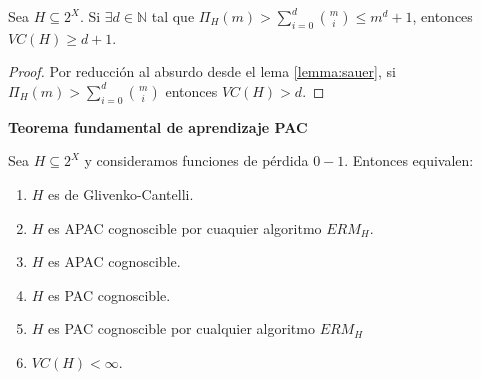 \begin{corollary}
Sea $H \subseteq 2^X$. Si $\exists d\in \mathbb{N}$ tal que $\Pi_{H} (m) > \sum_{i=0}^d \binom{m}{i} \le m^d + 1$,
entonces $VC(H) \ge d+1$.
\end{corollary}

\begin{proof}
Por reducción al absurdo desde el lema \ref{lemma:sauer}, si $\Pi_{H}(m) > \sum_{i=0}^d \binom{m}{i}$ entonces $VC(H) > d$.
\end{proof}

\begin{theorem}
 
\end{theorem}



\begin{theorem}
\textbf{Teorema fundamental de aprendizaje PAC}

Sea $H\subseteq 2^X$ y consideramos funciones de pérdida $0-1$. Entonces equivalen:

\begin{enumerate}[i]
\item \label{th:fundi} $H$ es de Glivenko-Cantelli.
\item \label{th:fundii} $H$ es APAC cognoscible por cuaquier algoritmo $ERM_H$.
\item \label{th:fundiii} $H$ es APAC cognoscible.
\item \label{th:fundiv} $H$ es PAC cognoscible.
\item \label{th:fundv} $H$ es PAC cognoscible por cualquier algoritmo $ERM_H$
\item \label{th:fundvi} $VC (H) < \infty$.
\end{enumerate}
\end{theorem}

